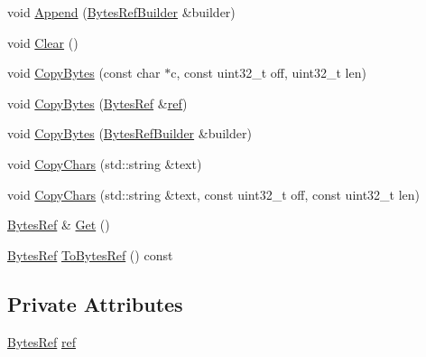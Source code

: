 \begin{DoxyCompactItemize}
\item 
void \mbox{\hyperlink{classlucene_1_1core_1_1util_1_1BytesRefBuilder_ad3508204608813b8d5cab9a3a9893c21}{Append}} (\mbox{\hyperlink{classlucene_1_1core_1_1util_1_1BytesRefBuilder}{Bytes\+Ref\+Builder}} \&builder)
\item 
void \mbox{\hyperlink{classlucene_1_1core_1_1util_1_1BytesRefBuilder_a32061ccc3f4761a0c210d96bc767506a}{Clear}} ()
\item 
void \mbox{\hyperlink{classlucene_1_1core_1_1util_1_1BytesRefBuilder_aa96983554d3a7042ee52f881aab190a0}{Copy\+Bytes}} (const char $\ast$c, const uint32\+\_\+t off, uint32\+\_\+t len)
\item 
void \mbox{\hyperlink{classlucene_1_1core_1_1util_1_1BytesRefBuilder_ad03ce9a53e3dbd380fc9b34dcfa3de51}{Copy\+Bytes}} (\mbox{\hyperlink{classlucene_1_1core_1_1util_1_1BytesRef}{Bytes\+Ref}} \&\mbox{\hyperlink{classlucene_1_1core_1_1util_1_1BytesRefBuilder_ad6f2fc3362182886584f9c3a5fcb9a56}{ref}})
\item 
void \mbox{\hyperlink{classlucene_1_1core_1_1util_1_1BytesRefBuilder_a3fccb29fdf28aad9a850b17228f2b71a}{Copy\+Bytes}} (\mbox{\hyperlink{classlucene_1_1core_1_1util_1_1BytesRefBuilder}{Bytes\+Ref\+Builder}} \&builder)
\item 
void \mbox{\hyperlink{classlucene_1_1core_1_1util_1_1BytesRefBuilder_a93e4b7444976f335d0b78c59cfb1c369}{Copy\+Chars}} (std\+::string \&text)
\item 
void \mbox{\hyperlink{classlucene_1_1core_1_1util_1_1BytesRefBuilder_aecfe5fb3b1ce86ec5c6358b3e1d06e4c}{Copy\+Chars}} (std\+::string \&text, const uint32\+\_\+t off, const uint32\+\_\+t len)
\item 
\mbox{\hyperlink{classlucene_1_1core_1_1util_1_1BytesRef}{Bytes\+Ref}} \& \mbox{\hyperlink{classlucene_1_1core_1_1util_1_1BytesRefBuilder_aa2ba757baac66b6dd039452f7384608e}{Get}} ()
\item 
\mbox{\hyperlink{classlucene_1_1core_1_1util_1_1BytesRef}{Bytes\+Ref}} \mbox{\hyperlink{classlucene_1_1core_1_1util_1_1BytesRefBuilder_ae481f6bccf50d56bf37a5a726c89f6ca}{To\+Bytes\+Ref}} () const
\end{DoxyCompactItemize}
\subsection*{Private Attributes}
\begin{DoxyCompactItemize}
\item 
\mbox{\hyperlink{classlucene_1_1core_1_1util_1_1BytesRef}{Bytes\+Ref}} \mbox{\hyperlink{classlucene_1_1core_1_1util_1_1BytesRefBuilder_ad6f2fc3362182886584f9c3a5fcb9a56}{ref}}
\end{DoxyCompactItemize}


